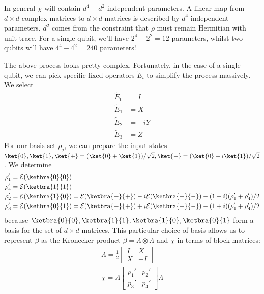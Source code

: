 In general $\chi$ will contain $d^4 - d^2$ independent parameters. A linear map from $d \times d$
complex matrices to $d \times d$ matrices is described by $d^4$ independent parameters. $d^2$ comes
from the constraint that $\rho$ must remain Hermitian with unit trace. For a single qubit, we'll
have $2^4 - 2^2 = 12$ parameters, whilst two qubits will have $4^4 - 4^2 = 240$ parameters!  

The above process looks pretty complex. Fortunately, in the case of a single qubit, we can pick
specific fixed operators $\tilde{E}_i$ to simplify the process massively. We select
\begin{align}
    \tilde{E}_0 &= I \\
    \tilde{E}_1 &= X \\
    \tilde{E}_2 &= -iY \\
    \tilde{E}_3 &= Z
\end{align}
For our basis set $\rho_j$, we can prepare the input states $\ket{0}, \ket{1}, \ket{+} = (\ket{0} +
\ket{1}) / \sqrt{2}, \ket{-}= (\ket{0} + i\ket{1}) / \sqrt{2}$. We determine
\begin{align}
    \rho_1' &= \mathcal{E}(\ketbra{0}{0}) \\
    \rho_4' &= \mathcal{E}(\ketbra{1}{1}) \\
    \rho_2' &= \mathcal{E}(\ketbra{1}{0}) = \mathcal{E}(\ketbra{+}{+}) - i\mathcal{E}(\ketbra{-}{-}) - (1 - i)(\rho_1' + \rho_4') / 2 \\
    \rho_3' &= \mathcal{E}(\ketbra{0}{1}) = \mathcal{E}(\ketbra{+}{+}) + i\mathcal{E}(\ketbra{-}{-}) - (1 + i)(\rho_1' + \rho_4') / 2
\end{align}
because $\ketbra{0}{0}, \ketbra{1}{1}, \ketbra{1}{0}, \ketbra{0}{1}$ form a basis for the set of $d
\times d$ matrices. This particular choice of basis allows us to represent $\beta$ as the Kronecker
product $\beta = \Lambda \otimes \Lambda$ and $\chi$ in terms of block matrices:
\begin{gather}
    \Lambda = \frac{1}{2}
    \begin{bmatrix}
        I & X  \\
        X & -I
    \end{bmatrix} \\
    \chi = \Lambda 
    \begin{bmatrix}
        p_1' & p_2' \\
        p_3' & p_4'
    \end{bmatrix} \Lambda
\end{gather}
